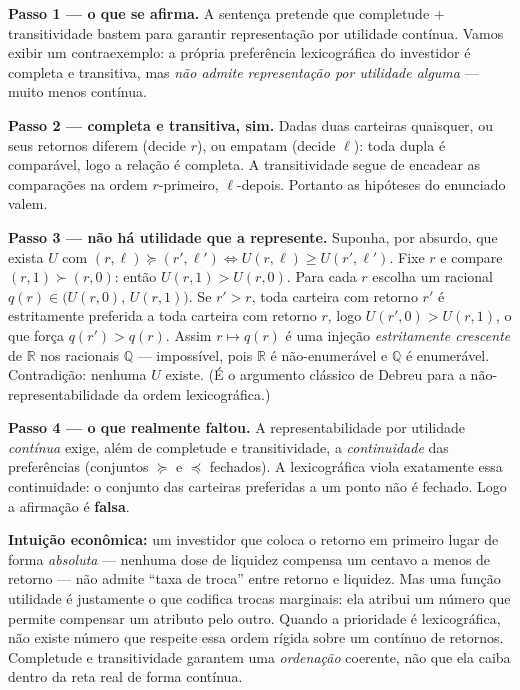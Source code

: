 \begin{solucao}
\textbf{Passo 1 — o que se afirma.} A sentença pretende que completude $+$ transitividade bastem para garantir representação por utilidade contínua. Vamos exibir um contraexemplo: a própria preferência lexicográfica do investidor é completa e transitiva, mas \emph{não admite representação por utilidade alguma} — muito menos contínua.

\textbf{Passo 2 — completa e transitiva, sim.} Dadas duas carteiras quaisquer, ou seus retornos diferem (decide $r$), ou empatam (decide $\ell$): toda dupla é comparável, logo a relação é completa. A transitividade segue de encadear as comparações na ordem $r$-primeiro, $\ell$-depois. Portanto as hipóteses do enunciado valem.

\textbf{Passo 3 — não há utilidade que a represente.} Suponha, por absurdo, que exista $U$ com $(r,\ell)\succeq(r',\ell')\iff U(r,\ell)\ge U(r',\ell')$. Fixe $r$ e compare $(r,1)\succ(r,0)$: então $U(r,1)>U(r,0)$. Para cada $r$ escolha um racional $q(r)\in\big(U(r,0),\,U(r,1)\big)$. Se $r'>r$, toda carteira com retorno $r'$ é estritamente preferida a toda carteira com retorno $r$, logo $U(r',0)>U(r,1)$, o que força $q(r')>q(r)$. Assim $r\mapsto q(r)$ é uma injeção \emph{estritamente crescente} de $\mathbb{R}$ nos racionais $\mathbb{Q}$ — impossível, pois $\mathbb{R}$ é não-enumerável e $\mathbb{Q}$ é enumerável. Contradição: nenhuma $U$ existe. (É o argumento clássico de Debreu para a não-representabilidade da ordem lexicográfica.)

\textbf{Passo 4 — o que realmente faltou.} A representabilidade por utilidade \emph{contínua} exige, além de completude e transitividade, a \emph{continuidade} das preferências (conjuntos $\succeq$ e $\preceq$ fechados). A lexicográfica viola exatamente essa continuidade: o conjunto das carteiras preferidas a um ponto não é fechado. Logo a afirmação é \textbf{falsa}.

\textbf{Intuição econômica:} um investidor que coloca o retorno em primeiro lugar de forma \emph{absoluta} — nenhuma dose de liquidez compensa um centavo a menos de retorno — não admite ``taxa de troca'' entre retorno e liquidez. Mas uma função utilidade é justamente o que codifica trocas marginais: ela atribui um número que permite compensar um atributo pelo outro. Quando a prioridade é lexicográfica, não existe número que respeite essa ordem rígida sobre um contínuo de retornos. Completude e transitividade garantem uma \emph{ordenação} coerente, não que ela caiba dentro da reta real de forma contínua.
\end{solucao}

